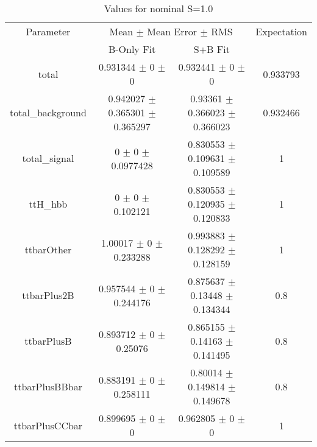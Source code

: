 \begin{table}
\centering
\caption{Values for nominal S=1.0}
\begin{tabular}{cccc}
\toprule
Parameter & \multicolumn{2}{c}{Mean $\pm$ Mean Error $\pm$ RMS} & Expectation\\
 & B-Only Fit & S+B Fit & \\
\midrule
total & \num{0.931344} $\pm$ \num{0} $\pm$ \num{0} & \num{0.932441} $\pm$ \num{0} $\pm$ \num{0} & \num{0.933793}\\
total\_background & \num{0.942027} $\pm$ \num{0.365301} $\pm$ \num{0.365297} & \num{0.93361} $\pm$ \num{0.366023} $\pm$ \num{0.366023} & \num{0.932466}\\
total\_signal & \num{0} $\pm$ \num{0} $\pm$ \num{0.0977428} & \num{0.830553} $\pm$ \num{0.109631} $\pm$ \num{0.109589} & \num{1}\\
ttH\_hbb & \num{0} $\pm$ \num{0} $\pm$ \num{0.102121} & \num{0.830553} $\pm$ \num{0.120935} $\pm$ \num{0.120833} & \num{1}\\
ttbarOther & \num{1.00017} $\pm$ \num{0} $\pm$ \num{0.233288} & \num{0.993883} $\pm$ \num{0.128292} $\pm$ \num{0.128159} & \num{1}\\
ttbarPlus2B & \num{0.957544} $\pm$ \num{0} $\pm$ \num{0.244176} & \num{0.875637} $\pm$ \num{0.13448} $\pm$ \num{0.134344} & \num{0.8}\\
ttbarPlusB & \num{0.893712} $\pm$ \num{0} $\pm$ \num{0.25076} & \num{0.865155} $\pm$ \num{0.14163} $\pm$ \num{0.141495} & \num{0.8}\\
ttbarPlusBBbar & \num{0.883191} $\pm$ \num{0} $\pm$ \num{0.258111} & \num{0.80014} $\pm$ \num{0.149814} $\pm$ \num{0.149678} & \num{0.8}\\
ttbarPlusCCbar & \num{0.899695} $\pm$ \num{0} $\pm$ \num{0} & \num{0.962805} $\pm$ \num{0} $\pm$ \num{0} & \num{1}\\
\bottomrule
\end{tabular}
\end{table}